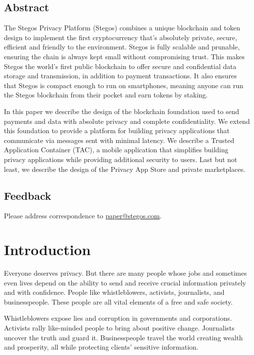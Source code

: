 \documentclass[8pt,fleqn,openany]{book}
\begin{document}
\newpage

\tableofcontents\newpage

\section{Abstract}

The Stegos Privacy Platform (Stegos) combines a unique blockchain and token design to implement the first cryptocurrency that’s absolutely private, secure, efficient and friendly to the environment. Stegos is fully scalable and prunable, ensuring the chain is always kept small without compromising trust. This makes Stegos the world’s first public blockchain to offer secure and confidential data storage and transmission, in addition to payment transactions. It also ensures that Stegos is compact enough to run on smartphones, meaning anyone can run the Stegos blockchain from their pocket and earn tokens by staking.
  
In this paper we describe the design of the blockchain foundation used to send payments and data with absolute privacy and complete confidentiality. We extend this foundation to provide a platform for building privacy applications that communicate via messages sent with minimal latency. We describe a Trusted Application Container (TAC), a mobile application that simplifies building privacy applications while providing additional security to users. Last but not least, we describe the design of the Privacy App Store and private marketplaces.

\section{Feedback}

Please address correspondence to \href{mailto:paper@stegos.com}{paper@stegos.com}.

\chapter{Introduction}\label{chap:intro}

Everyone deserves privacy. But there are many people whose jobs and sometimes even lives depend on the ability to send and receive crucial information privately and with confidence. People like whistleblowers, activists, journalists, and businesspeople. These people are all vital elements of a free and safe society. 

Whistleblowers expose lies and corruption in governments and corporations. Activists rally like-minded people to bring about positive change. Journalists uncover the truth and guard it. Businesspeople travel the world creating wealth and prosperity, all while protecting clients’ sensitive information.
\end{document}

